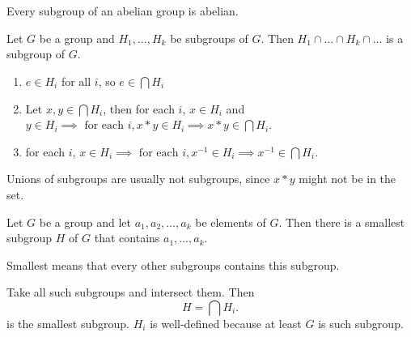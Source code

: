 \documentclass[class=article,crop=false]{standalone}
\begin{document}
\section{}
\begin{note}[]
Every subgroup of an abelian group is abelian.
\end{note}
\begin{thm}[]
Let $ G$ be a group and  $ H_1,\ldots,H_k$ be subgroups of $ G$. Then $ H_1 \cap \ldots \cap H_k \cap  \ldots$ is a subgroup of $ G$.
\end{thm}
\begin{prf}
\begin{enumerate}[label=(\roman*)]
	\item $ e \in H_i$ for all $ i$, so $ e \in \bigcap H_i$
	\item Let $ x,y \in \bigcap H_i$, then for each $ i$, $ x \in H_i$ and $ y \in H_i \implies \text{ for each } i,x*y \in H_i \implies x*y \in \bigcap H_i$.
	\item for each $ i$,  $ x \in H_i \implies \text{ for each }i, x^{-1} \in H_i \implies x^{-1} \in \bigcap H_i$.
\end{enumerate}
\end{prf}

\begin{note}[]
Unions of subgroups are usually not subgroups, since $ x*y $ might not be in the set.
\end{note}

\begin{thm}[]
Let $ G$ be a group and let  $ a_1,a_2,\ldots,a_k$ be elements of $ G$. Then there is a smallest subgroup $ H$ of $ G$ that contains  $ a_1,\ldots,a_k$. 
\end{thm}
\begin{note}[]
Smallest means that every other subgroups contains this subgroup.
\end{note}
\begin{prf}
Take all such subgroups and intersect them. Then 
\[
H = \bigcap H_i
.\]
is the smallest subgroup. $ H_i$ is well-defined because at least $ G$ is such subgroup.
\end{prf}
\end{document}
